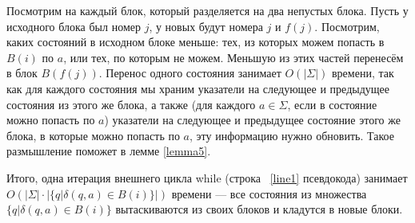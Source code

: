 \documentclass{article}
\begin{document}
Посмотрим на каждый блок, который разделяется на два непустых блока. Пусть у исходного блока был номер $j$, у новых будут номера $j$ и $f(j)$. Посмотрим, каких состояний в исходном блоке меньше: тех, из которых можем попасть в $B(i)$ по $a$, или тех, по которым не можем. Меньшую из этих частей перенесём в блок $B(f(j))$. Перенос одного состояния занимает $O(|\Sigma|)$ времени, так как для каждого состояния мы храним указатели на следующее и предыдущее состояния из этого же блока, а также (для каждого $a \in \Sigma$, если в состояние можно попасть по $a$) указатели на следующее и предыдущее состояние этого же блока, в которые можно попасть по $a$, эту информацию нужно обновить. Такое размышление поможет в лемме \ref{lemma5}.



Итого, одна итерация внешнего цикла while (строка ~\ref{line1} псевдокода) занимает $O(|\Sigma|\cdot|\{q | \delta(q, a) \in B(i)\}|)$ времени --- все состояния из множества $\{q | \delta(q, a) \in B(i)\}$ вытаскиваются из своих блоков и кладутся в новые блоки.
\end{document}
